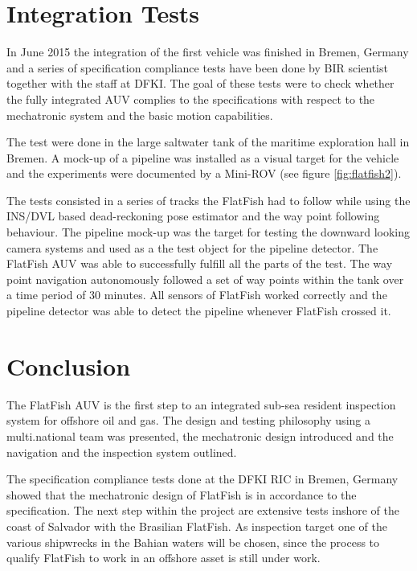 \documentclass[conference]{IEEEtran}
\begin{document}
\section{Integration Tests}

In June 2015 the integration of the first vehicle was finished in Bremen, Germany and a
series of specification compliance tests have been done by BIR scientist together with the 
staff at DFKI. The goal of these tests were to check whether the fully integrated AUV 
complies to the specifications with respect to the mechatronic system and the basic motion 
capabilities. 

The test were done in the large saltwater tank of the maritime exploration hall in Bremen.
A mock-up of a pipeline was installed as a visual target for the vehicle and the
experiments were documented by a Mini-ROV (see figure \ref{fig:flatfish2}). 

The tests consisted in a series of tracks the FlatFish had to follow while using the
INS/DVL based dead-reckoning pose estimator and the way point following behaviour. The
pipeline mock-up was the target for testing the downward looking camera systems and 
used as a the test object for the pipeline detector. The FlatFish AUV was able to successfully
fulfill all the parts of the test. The way point navigation autonomously followed a set of
way points within the tank over a time period of 30 minutes. All sensors of FlatFish
worked correctly and the pipeline detector was able to detect the pipeline whenever
FlatFish crossed it. 

\section{Conclusion}

The FlatFish AUV is the first step to an integrated sub-sea resident inspection system for
offshore oil and gas. The design and testing philosophy using a multi.national team was 
presented, the mechatronic design introduced and the navigation and the inspection 
system outlined. 

The specification compliance tests done at the DFKI RIC in Bremen,
Germany showed that the mechatronic design of FlatFish is in accordance to the 
specification. The next step within the project are extensive tests inshore of the coast of 
Salvador with the Brasilian FlatFish. As inspection target one of the various shipwrecks in 
the Bahian waters will be chosen, since the process to qualify FlatFish to work in an offshore 
asset is still under work. 
\end{document}

